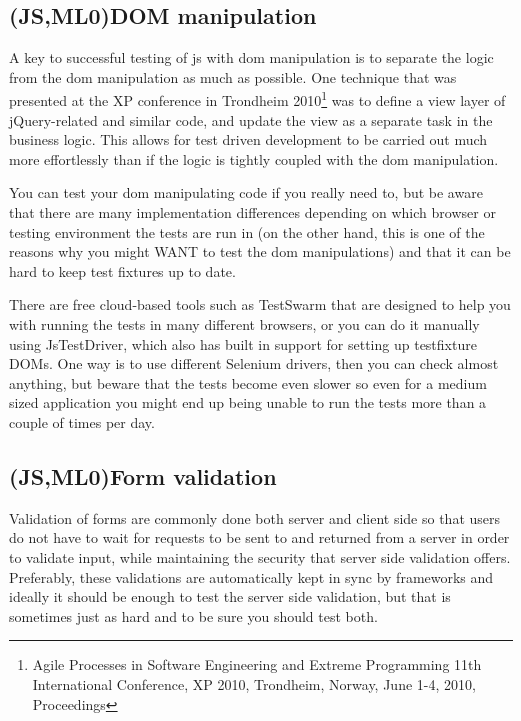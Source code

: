 \documentclass[11pt]{article}
\begin{document}
\subsection{(JS,ML0)DOM manipulation}

A key to successful testing of \gls{js} with \gls{dom} manipulation is to separate the logic from the \gls{dom} manipulation as much as possible. One technique that was presented at the XP conference in Trondheim 2010\footnote{Agile Processes in Software Engineering and Extreme Programming 11th International Conference, XP 2010, Trondheim, Norway, June 1-4, 2010, Proceedings} was to define a view layer of jQuery-related and similar code, and update the view as a separate task in the business logic. This allows for test driven development to be carried out much more effortlessly than if the logic is tightly coupled with the \gls{dom} manipulation. \cite[question~4]{Ahnve}

You can test your \gls{dom} manipulating code if you really need to, but be aware that there are many implementation differences depending on which browser or testing environment the tests are run in (on the other hand, this is one of the reasons why you might WANT to test the \gls{dom} manipulations) and that it can be hard to keep test fixtures up to date.

There are free cloud-based tools such as TestSwarm that are designed to help you with running the tests in many different browsers, or you can do it manually using JsTestDriver, which also has built in support for setting up
\gls{testfixture} DOMs. One way is to use different Selenium drivers, then you can check almost anything, but beware that the tests become even slower so even for a medium sized application you might end up being unable to run the tests more than a couple of times per day.

\subsection{(JS,ML0)Form validation}

Validation of forms are commonly done both server and client side so that users do not have to wait for requests to be sent to and returned from a server in order to validate input, while maintaining the security that server side validation offers. Preferably, these validations are automatically kept in sync by frameworks and ideally it should be enough to test the server side validation, but that is sometimes just as hard and to be sure you should test both.
\end{document}
